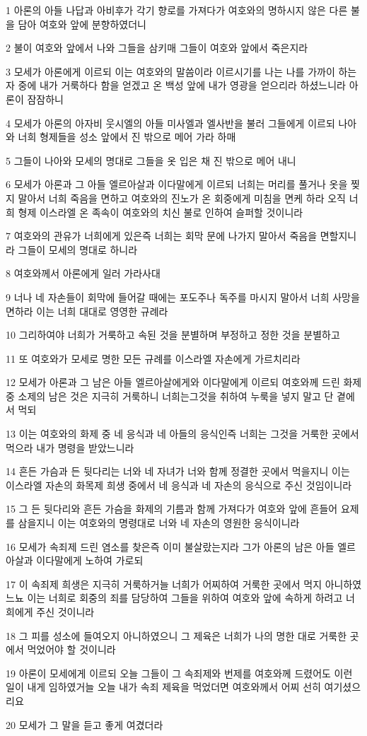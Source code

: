 \par 1 아론의 아들 나답과 아비후가 각기 향로를 가져다가 여호와의 명하시지 않은 다른 불을 담아 여호와 앞에 분향하였더니
\par 2 불이 여호와 앞에서 나와 그들을 삼키매 그들이 여호와 앞에서 죽은지라
\par 3 모세가 아론에게 이르되 이는 여호와의 말씀이라 이르시기를 나는 나를 가까이 하는 자 중에 내가 거룩하다 함을 얻겠고 온 백성 앞에 내가 영광을 얻으리라 하셨느니라 아론이 잠잠하니
\par 4 모세가 아론의 아자비 웃시엘의 아들 미사엘과 엘사반을 불러 그들에게 이르되 나아와 너희 형제들을 성소 앞에서 진 밖으로 메어 가라 하매
\par 5 그들이 나아와 모세의 명대로 그들을 옷 입은 채 진 밖으로 메어 내니
\par 6 모세가 아론과 그 아들 엘르아살과 이다말에게 이르되 너희는 머리를 풀거나 옷을 찢지 말아서 너희 죽음을 면하고 여호와의 진노가 온 회중에게 미침을 면케 하라 오직 너희 형제 이스라엘 온 족속이 여호와의 치신 불로 인하여 슬퍼할 것이니라
\par 7 여호와의 관유가 너희에게 있은즉 너희는 회막 문에 나가지 말아서 죽음을 면할지니라 그들이 모세의 명대로 하니라
\par 8 여호와께서 아론에게 일러 가라사대
\par 9 너나 네 자손들이 회막에 들어갈 때에는 포도주나 독주를 마시지 말아서 너희 사망을 면하라 이는 너희 대대로 영영한 규례라
\par 10 그리하여야 너희가 거룩하고 속된 것을 분별하며 부정하고 정한 것을 분별하고
\par 11 또 여호와가 모세로 명한 모든 규례를 이스라엘 자손에게 가르치리라
\par 12 모세가 아론과 그 남은 아들 엘르아살에게와 이다말에게 이르되 여호와께 드린 화제 중 소제의 남은 것은 지극히 거룩하니 너희는그것을 취하여 누룩을 넣지 말고 단 곁에서 먹되
\par 13 이는 여호와의 화제 중 네 응식과 네 아들의 응식인즉 너희는 그것을 거룩한 곳에서 먹으라 내가 명령을 받았느니라
\par 14 흔든 가슴과 든 뒷다리는 너와 네 자녀가 너와 함께 정결한 곳에서 먹을지니 이는 이스라엘 자손의 화목제 희생 중에서 네 응식과 네 자손의 응식으로 주신 것임이니라
\par 15 그 든 뒷다리와 흔든 가슴을 화제의 기름과 함께 가져다가 여호와 앞에 흔들어 요제를 삼을지니 이는 여호와의 명령대로 너와 네 자손의 영원한 응식이니라
\par 16 모세가 속죄제 드린 염소를 찾은즉 이미 불살랐는지라 그가 아론의 남은 아들 엘르아살과 이다말에게 노하여 가로되
\par 17 이 속죄제 희생은 지극히 거룩하거늘 너희가 어찌하여 거룩한 곳에서 먹지 아니하였느뇨 이는 너희로 회중의 죄를 담당하여 그들을 위하여 여호와 앞에 속하게 하려고 너희에게 주신 것이니라
\par 18 그 피를 성소에 들여오지 아니하였으니 그 제육은 너희가 나의 명한 대로 거룩한 곳에서 먹었어야 할 것이니라
\par 19 아론이 모세에게 이르되 오늘 그들이 그 속죄제와 번제를 여호와께 드렸어도 이런 일이 내게 임하였거늘 오늘 내가 속죄 제육을 먹었더면 여호와께서 어찌 선히 여기셨으리요
\par 20 모세가 그 말을 듣고 좋게 여겼더라

